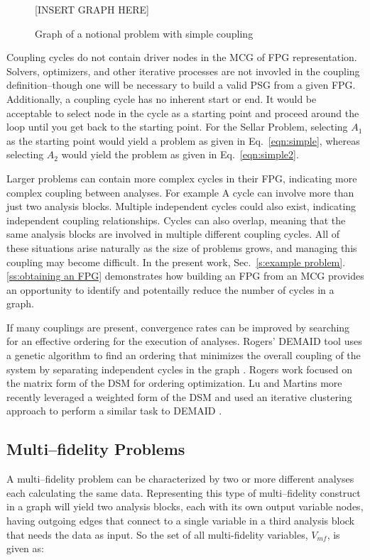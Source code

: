   \begin{figure}
      \begin{center}
      [INSERT GRAPH HERE]
      \caption{Graph of a notional problem with simple coupling \label{f:coupling}}
      \end{center}
  \end{figure}

  Coupling cycles do not contain driver nodes in the MCG of FPG representation. 
  Solvers, optimizers, and other iterative processes are not invovled in the coupling 
  definition--though one will be necessary to build a valid PSG from a given FPG. 
  Additionally, a coupling cycle has no inherent start or end. It would be acceptable to select
  node in the cycle as a starting point and proceed around the
  loop until you get back to the starting point. For the Sellar Problem, selecting 
  $A_1$ as the starting point would yield a problem as given in 
  Eq.~\ref{eqn:simple}, whereas selecting $A_2$ would yield the problem as given in 
  Eq.~\ref{eqn:simple2}.

  Larger problems can contain more complex cycles in their FPG, indicating more 
  complex coupling between analyses. For example A cycle can involve more than 
  just two analysis blocks. Multiple independent cycles could also exist, indicating 
  independent coupling relationships. Cycles can also overlap, meaning that the same analysis 
  blocks are involved in multiple different coupling cycles. All of these situations
  arise naturally as the size of problems grows, and managing this coupling may
  become difficult. In the present work, Sec.~\ref{s:example problem}.\ref{ss:obtaining an FPG} 
  demonstrates how building an FPG from an MCG provides an opportunity to 
  identify and potentailly reduce the number of cycles in a graph. 

  If many couplings are present, convergence rates can be improved by 
  searching for an effective ordering for the execution of analyses.
  Rogers' DEMAID tool uses a genetic algorithm to find an ordering that minimizes 
  the overall coupling of the system by separating independent cycles in the 
  graph \cite{rogers1996,rogers1996demaid}. Rogers work focused on the matrix 
  form of the DSM for ordering optimization. Lu and Martins more recently leveraged 
  a weighted form of the DSM and used an iterative clustering approach to perform a 
  similar task to DEMAID \cite{Lu2012}. 

\subsection{Multi--fidelity Problems}
  \label{ss:multi-fideliy problems}
  A multi--fidelity problem can be characterized by two or more different analyses 
  each calculating the same data. Representing this type of multi--fidelity 
  construct in a graph will yield two analysis blocks, each with its own output 
  variable nodes, having outgoing edges that connect to a single variable in a 
  third analysis block that needs the data as input. So the set of all multi-fidelity
  variables, $V_{mf}$, is given as: 

